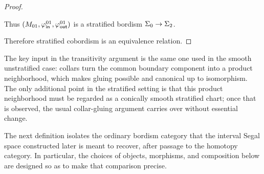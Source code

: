 \begin{proof}
\begin{enumerate}
        Thus $(M_{01},\varphi^{01}_{\sf in},\varphi^{01}_{\sf out})$ is a stratified bordism $\Sigma_0\rightarrow \Sigma_2$.
    \end{enumerate}
    Therefore stratified cobordism is an equivalence relation.
\end{proof}

\begin{remark}
    The key input in the transitivity argument is the same one used in the smooth unstratified case: collars turn the common boundary component into a product neighborhood, which makes gluing possible and canonical up to isomorphism. The only additional point in the stratified setting is that this product neighborhood must be regarded as a conically smooth stratified chart; once that is observed, the usual collar-gluing argument carries over without essential change.
\end{remark}

The next definition isolates the ordinary bordism category that the interval Segal space constructed later is meant to recover, after passage to the homotopy category. In particular, the choices of objects, morphisms, and composition below are designed so as to make that comparison precise.

